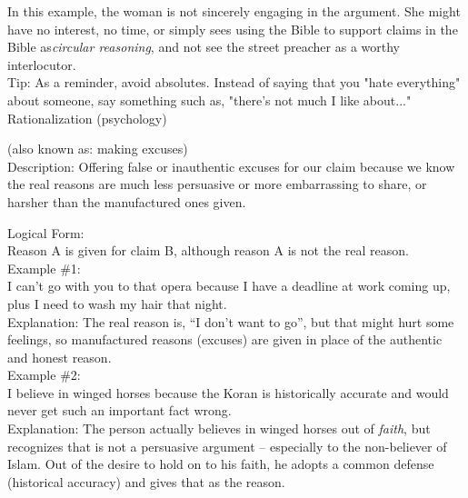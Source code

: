 \documentclass[a4paper,12pt,single,pdftex]{scrbook}
\begin{document}
    
      In this example, the woman is not sincerely engaging in the argument. She might have no interest, no time, or simply sees using the Bible to support claims in the Bible as{\em  {\it circular reasoning}}, and not see the street preacher as a worthy interlocutor.
    \\

    
      Tip: As a reminder, avoid absolutes. Instead of saying that you "hate everything" about someone, say something such as, "there's not much I like about..."
    \\

  

Rationalization (psychology)
    
      (also known as: making excuses)
    \\

  
    Description: Offering false or inauthentic excuses for our claim because we know the real reasons are much less persuasive or more embarrassing to share, or harsher than the manufactured ones given.

    
      Logical Form:
    \\

    
      Reason A is given for claim B, although reason A is not the real reason.
    \\

    
      Example \#1:
    \\

    
      I can’t go with you to that opera because I have a deadline at work coming up, plus I need to wash my hair that night.
    \\

    
      Explanation: The real reason is, “I don’t want to go”, but that might hurt some feelings, so manufactured reasons (excuses) are given in place of the authentic and honest reason.
    \\

    
      Example \#2:
    \\

    
      I believe in winged horses because the Koran is historically accurate and would never get such an important fact wrong.
    \\

    
      Explanation: The person actually believes in winged horses out of {\it faith}, but recognizes that is not a persuasive argument -- especially to the non-believer of Islam.  Out of the desire to hold on to his faith, he adopts a common defense (historical accuracy) and gives that as the reason.
    \\
\end{document}
